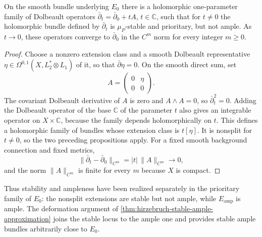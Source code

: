 \begin{proposition}\label{prop:hirzebruch-explicit-stable-degeneration}
On the smooth bundle underlying $E_0$ there is a holomorphic one-parameter family of Dolbeault operators $\bar\partial_t=\bar\partial_0+tA$, $t\in\mathbb C$, such that for $t\ne0$ the holomorphic bundle defined by $\bar\partial_t$ is $\mu_P$-stable and prioritary, but not ample. As $t\to0$, these operators converge to $\bar\partial_0$ in the $C^m$ norm for every integer $m\geq0$.
\end{proposition}
\begin{proof}
Choose a nonzero extension class and a smooth Dolbeault representative $\eta\in\Omega^{0,1}(X,L_2^*\otimes L_1)$ of it, so that $\bar\partial\eta=0$. On the smooth direct sum, set
\[
 A=\begin{pmatrix}0&\eta\\0&0\end{pmatrix}.
\]
The covariant Dolbeault derivative of $A$ is zero and $A\wedge A=0$, so $\bar\partial_t^2=0$. Adding the Dolbeault operator of the base $\mathbb C$ of the parameter $t$ also gives an integrable operator on $X\times\mathbb C$, because the family depends holomorphically on $t$. This defines a holomorphic family of bundles whose extension class is $t[\eta]$. It is nonsplit for $t\neq0$, so the two preceding propositions apply. For a fixed smooth background connection and fixed metrics,
\[
 \|\bar\partial_t-\bar\partial_0\|_{C^m}
 =|t|\,\|A\|_{C^m}\longrightarrow0,
\]
and the norm $\|A\|_{C^m}$ is finite for every $m$ because $X$ is compact.
\end{proof}

Thus stability and ampleness have been realized separately in the prioritary family of $E_0$: the nonsplit extensions are stable but not ample, while $E_{\mathrm{amp}}$ is ample. The deformation argument of \cref{thm:hirzebruch-stable-ample-approximation} joins the stable locus to the ample one and provides stable ample bundles arbitrarily close to $E_0$.
